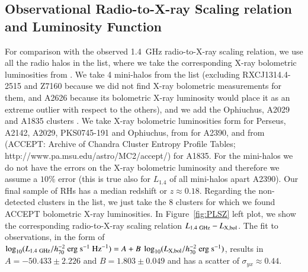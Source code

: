 \documentclass[traditabstract]{aa}
\newcommand{\rmn}{\mathrm}
\begin{document}
\begin{appendix}
\section{Observational Radio-to-X-ray Scaling relation and Luminosity Function}
\label{app:D}

For comparison with the observed 1.4~GHz radio-to-X-ray scaling relation, we use all the radio halos in the \cite{2011A&A...527A..99E} list, where we take the corresponding X-ray bolometric luminosities from \cite{2009A&A...507..661B}. We take 4 mini-halos from the \cite{2011A&A...527A..99E} list (excluding RXCJ1314.4-2515 and Z7160 because we did not find X-ray bolometric measurements for them, and A2626 because its bolometric X-ray luminosity would place it as an extreme outlier with respect to the others), and we add the Ophiuchus, A2029 and A1835 clusters \citep{2009A&A...499..371G}. We take X-ray bolometric luminosities form \cite{2002ApJ...567..716R} for Perseus, A2142, A2029,  PKS0745-191 and Ophiuchus, from \cite{Boehringer:1998vv} for A2390, and from \cite{2009ApJS..182...12C} (ACCEPT: Archive of Chandra Cluster Entropy Profile Tables; http://www.pa.msu.edu/astro/MC2/accept/) for A1835. For the mini-halos we do not have the errors on the X-ray bolometric luminosity and therefore we assume a $10\%$ error (this is true also for $L_{1.4}$ of all mini-halos apart A2390). Our final sample of RHs has a median redshift or $z\approx0.18$. Regarding the non-detected clusters in the \cite{2011A&A...527A..99E} list, we just take the 8 clusters for which we found ACCEPT bolometric X-ray luminosities. In Figure~\ref{fig:PLSZ} left plot, we show the corresponding radio-to-X-ray scaling relation $L_{1.4~\rm{GHz}}-L_{\rm{X,bol}}$. The fit to observations, in the form of $\log_{10} (L_{1.4~\rmn{GHz}}/h_{70}^{-2}~\rmn{erg}~\rmn{s}^{-1}~\rmn{Hz}^{-1}) = A + B~\log_{10} (L_{ \rm{X,bol}}/h_{70}^{-2}~\rmn{erg}~\rmn{s}^{-1})$, results in $A=-50.433\pm2.226$ and $B=1.803\pm0.049$ and has a scatter of $\sigma_{yx} \approx 0.44$. 


\end{appendix}
\end{document}
